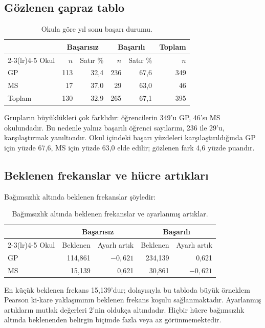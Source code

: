 \subsection{Gözlenen çapraz tablo}

\begin{table}[htbp]
\centering
\caption{Okula göre yıl sonu başarı durumu.}
\begin{tabular}{@{}lrrrrr@{}}
\toprule
 & \multicolumn{2}{c}{Başarısız} & \multicolumn{2}{c}{Başarılı} & Toplam \\
\cmidrule(lr){2-3}\cmidrule(lr){4-5}
Okul & $n$ & Satır \% & $n$ & Satır \% & $n$ \\
\midrule
GP & 113 & 32,4 & 236 & 67,6 & 349 \\
MS & 17 & 37,0 & 29 & 63,0 & 46 \\
\midrule
Toplam & 130 & 32,9 & 265 & 67,1 & 395 \\
\bottomrule
\end{tabular}
\end{table}

Grupların büyüklükleri çok farklıdır: öğrencilerin 349'u GP, 46'sı MS
okulundadır. Bu nedenle yalnız başarılı öğrenci sayılarını, 236 ile 29'u,
karşılaştırmak yanıltıcıdır. Okul içindeki başarı yüzdeleri karşılaştırıldığında
GP için yüzde 67,6, MS için yüzde 63,0 elde edilir; gözlenen fark 4,6 yüzde
puandır.

\subsection{Beklenen frekanslar ve hücre artıkları}

Bağımsızlık altında beklenen frekanslar şöyledir:

\begin{table}[htbp]
\centering
\caption{Bağımsızlık altında beklenen frekanslar ve ayarlanmış artıklar.}
\begin{tabular}{@{}lrrrr@{}}
\toprule
 & \multicolumn{2}{c}{Başarısız} & \multicolumn{2}{c}{Başarılı} \\
\cmidrule(lr){2-3}\cmidrule(lr){4-5}
Okul & Beklenen & Ayarlı artık & Beklenen & Ayarlı artık \\
\midrule
GP & 114,861 & $-0{,}621$ & 234,139 & 0,621 \\
MS & 15,139 & 0,621 & 30,861 & $-0{,}621$ \\
\bottomrule
\end{tabular}
\end{table}

En küçük beklenen frekans 15,139'dur; dolayısıyla bu tabloda büyük örneklem
Pearson ki-kare yaklaşımının beklenen frekans koşulu sağlanmaktadır. Ayarlanmış
artıkların mutlak değerleri 2'nin oldukça altındadır. Hiçbir hücre bağımsızlık
altında beklenenden belirgin biçimde fazla veya az görünmemektedir.

